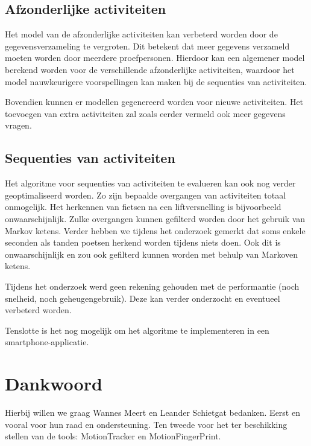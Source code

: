 \documentclass{article}
\begin{document}
\subsection{Afzonderlijke activiteiten}

Het model van de afzonderlijke activiteiten kan verbeterd worden door de gegevensverzameling te vergroten. Dit betekent dat meer gegevens verzameld moeten worden door meerdere proefpersonen. Hierdoor kan een algemener model berekend worden voor de verschillende afzonderlijke activiteiten, waardoor het model nauwkeurigere voorspellingen kan maken bij de sequenties van activiteiten.

Bovendien kunnen er modellen gegenereerd worden voor nieuwe activiteiten. Het toevoegen van extra activiteiten zal zoals eerder vermeld ook meer gegevens vragen.

\subsection{Sequenties van activiteiten}

Het algoritme voor sequenties van activiteiten te evalueren kan ook nog verder geoptimaliseerd worden. 
	Zo zijn bepaalde overgangen van activiteiten totaal onmogelijk. Het herkennen van fietsen na een liftversnelling is bijvoorbeeld onwaarschijnlijk. Zulke overgangen kunnen gefilterd worden door het gebruik van Markov ketens. Verder hebben we tijdens het onderzoek gemerkt dat soms enkele seconden als tanden poetsen herkend worden tijdens niets doen. Ook dit is onwaarschijnlijk en zou ook gefilterd kunnen worden met behulp van Markoven ketens.

Tijdens het onderzoek werd geen rekening gehouden met de performantie (noch snelheid, noch geheugengebruik). Deze kan verder onderzocht en eventueel verbeterd worden.

	


Tenslotte is het nog mogelijk om het algoritme te implementeren in een smartphone-applicatie.

\section{Dankwoord}

Hierbij willen we graag Wannes Meert en Leander Schietgat bedanken. Eerst en vooral voor hun raad en ondersteuning. Ten tweede voor het ter beschikking stellen van de tools: MotionTracker en MotionFingerPrint.

\end{document}
